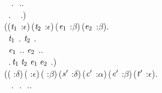 \begin{holmath}
\,\,\,\,\HOLSymConst{\HOLTokenIn{}}\,.\,\HOLSymConst{\HOLTokenConj{}}\,\,\HOLSymConst{\HOLTokenIn{}}\,..\,\HOLSymConst{\HOLTokenImp{}}\\
\,\,\,.\,\,\,\,\,\,\HOLSymConst{\HOLTokenIn{}}\,.)\,\HOLSymConst{\HOLTokenConj{}}\\
(\HOLSymConst{\HOLTokenForall{}}(\ensuremath{\HOLBoundVar{t}\sb{\mathrm{1}}} :\ensuremath{\epsilon})\,(\ensuremath{\HOLBoundVar{t}\sb{\mathrm{2}}} :\ensuremath{\epsilon})\,(\ensuremath{\HOLBoundVar{e}\sb{\mathrm{1}}} :\ensuremath{\beta})\,(\ensuremath{\HOLBoundVar{e}\sb{\mathrm{2}}} :\ensuremath{\beta}).\\
\,\,\,\ensuremath{\HOLBoundVar{t}\sb{\mathrm{1}}}\,\HOLSymConst{\HOLTokenIn{}}\,.\,\HOLSymConst{\HOLTokenConj{}}\,\ensuremath{\HOLBoundVar{t}\sb{\mathrm{2}}}\,\HOLSymConst{\HOLTokenIn{}}\,.\,\HOLSymConst{\HOLTokenConj{}}\\
\,\,\,\ensuremath{\HOLBoundVar{e}\sb{\mathrm{1}}}\,\HOLSymConst{\HOLTokenIn{}}\,..\,\HOLSymConst{\HOLTokenConj{}}\,\ensuremath{\HOLBoundVar{e}\sb{\mathrm{2}}}\,\HOLSymConst{\HOLTokenIn{}}\,..\,\HOLSymConst{\HOLTokenImp{}}\\
\,\,\,.\,\ensuremath{\HOLBoundVar{t}\sb{\mathrm{1}}}\,\ensuremath{\HOLBoundVar{t}\sb{\mathrm{2}}}\,\ensuremath{\HOLBoundVar{e}\sb{\mathrm{1}}}\,\ensuremath{\HOLBoundVar{e}\sb{\mathrm{2}}}\,\HOLSymConst{\HOLTokenIn{}}\,.)\,\HOLSymConst{\HOLTokenConj{}}\\
(\HOLSymConst{\HOLTokenForall{}}( :\ensuremath{\delta})\,( :\ensuremath{\epsilon})\,( :\ensuremath{\beta})\,(\ensuremath{\HOLBoundVar{s}\sp{\prime{}}} :\ensuremath{\delta})\,(\ensuremath{\HOLBoundVar{c}\sp{\prime{}}} :\ensuremath{\alpha})\,(\ensuremath{\HOLBoundVar{e}\sp{\prime{}}} :\ensuremath{\beta})\,(\ensuremath{\HOLBoundVar{t}\sp{\prime{}}} :\ensuremath{\epsilon}).\\
\,\,\,\,\HOLSymConst{\HOLTokenIn{}}\,.\,\HOLSymConst{\HOLTokenConj{}}\,\,\HOLSymConst{\HOLTokenIn{}}\,.\,\HOLSymConst{\HOLTokenConj{}}\,\,\HOLSymConst{\HOLTokenIn{}}\,..\,\HOLSymConst{\HOLTokenConj{}}\\

\end{holmath}
